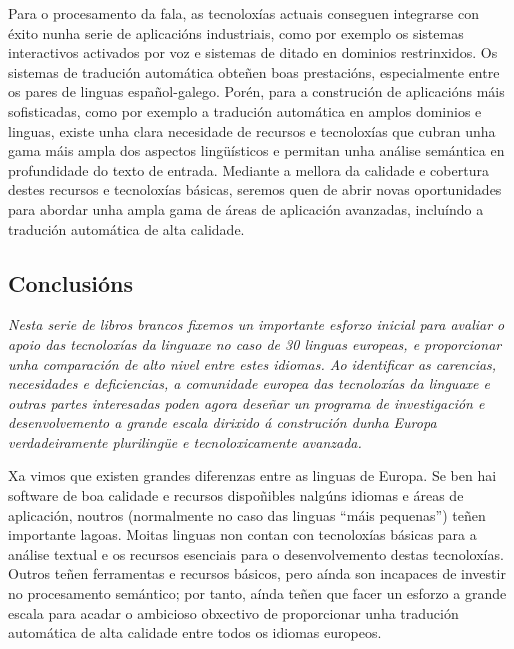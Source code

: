 \begin{multicols}{2}
\begin{itemize}
Para o procesamento da fala, as tecnoloxías actuais conseguen integrarse con éxito nunha serie de aplicacións industriais, como por exemplo os sistemas interactivos activados por voz e sistemas de ditado en dominios restrinxidos. Os sistemas de tradución automática obteñen boas prestacións, especialmente entre os pares de linguas español-galego. Porén, para a construción de aplicacións máis sofisticadas, como por exemplo a tradución automática en amplos dominios e linguas, existe unha clara necesidade de recursos e tecnoloxías que cubran unha gama máis ampla dos aspectos lingüísticos e permitan unha análise semántica en profundidade do texto de entrada. Mediante a mellora da calidade e cobertura destes recursos e tecnoloxías básicas, seremos quen de abrir novas oportunidades para abordar unha ampla gama de áreas de aplicación avanzadas, incluíndo a tradución automática de alta calidade.






\subsection{Conclusións}
\begin{multicols}{2}
\emph{Nesta serie de libros brancos fixemos un importante esforzo inicial para avaliar o apoio das tecnoloxías da linguaxe no caso de 30 linguas europeas, e proporcionar unha comparación de alto nivel entre estes idiomas. Ao identificar as carencias, necesidades e deficiencias, a comunidade europea das tecnoloxías da linguaxe e outras partes interesadas poden agora deseñar un programa de investigación e desenvolvemento a grande escala dirixido á construción dunha Europa verdadeiramente plurilingüe e tecnoloxicamente avanzada.}

Xa vimos que existen grandes diferenzas entre as linguas de Europa. Se ben hai software de boa calidade e recursos dispoñibles nalgúns idiomas e áreas de aplicación, noutros (normalmente no caso das linguas “máis pequenas”) teñen importante lagoas. Moitas linguas non contan con tecnoloxías básicas para a análise textual e os recursos esenciais para o desenvolvemento destas tecnoloxías. Outros teñen ferramentas e recursos básicos, pero aínda son incapaces de investir no procesamento semántico; por tanto, aínda teñen que facer un esforzo a grande escala para acadar o ambicioso obxectivo de proporcionar unha tradución automática de alta calidade entre todos os idiomas europeos.


\end{multicols}
\end{itemize}
\end{multicols}
